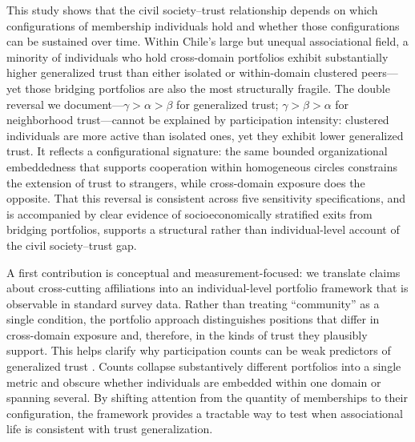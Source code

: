 This study shows that the civil society--trust relationship depends on which configurations of membership individuals hold and whether those configurations can be sustained over time. Within Chile's large but unequal associational field, a minority of individuals who hold cross-domain portfolios exhibit substantially higher generalized trust than either isolated or within-domain clustered peers---yet those bridging portfolios are also the most structurally fragile. The double reversal we document---$\gamma > \alpha > \beta$ for generalized trust; $\gamma > \beta > \alpha$ for neighborhood trust---cannot be explained by participation intensity: clustered individuals are more active than isolated ones, yet they exhibit lower generalized trust. It reflects a configurational signature: the same bounded organizational embeddedness that supports cooperation within homogeneous circles constrains the extension of trust to strangers, while cross-domain exposure does the opposite. That this reversal is consistent across five sensitivity specifications, and is accompanied by clear evidence of socioeconomically stratified exits from bridging portfolios, supports a structural rather than individual-level account of the civil society--trust gap.

A first contribution is conceptual and measurement-focused: we translate claims about cross-cutting affiliations into an individual-level portfolio framework that is observable in standard survey data. Rather than treating “community” as a single condition, the portfolio approach distinguishes positions that differ in cross-domain exposure and, therefore, in the kinds of trust they plausibly support. This helps clarify why participation counts can be weak predictors of generalized trust \parencite{paxton_association_2007, benton_uniters_2016}. Counts collapse substantively different portfolios into a single metric and obscure whether individuals are embedded within one domain or spanning several. By shifting attention from the quantity of memberships to their configuration, the framework provides a tractable way to test when associational life is consistent with trust generalization.

